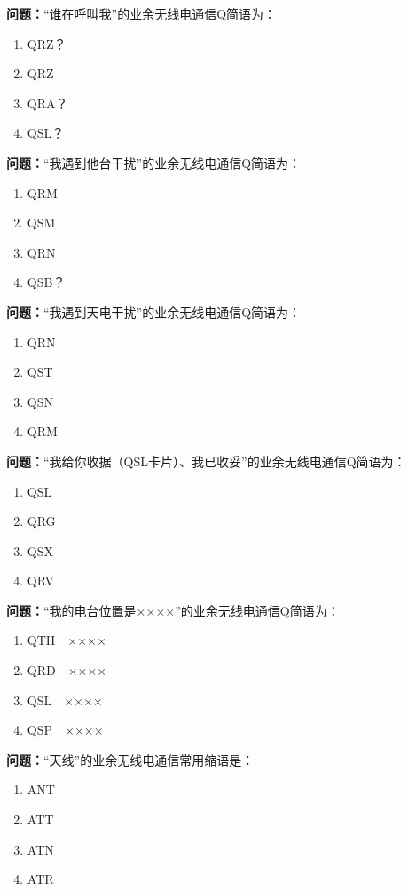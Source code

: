 \documentclass{ctexbook}%
\begin{document}
\textbf{问题：}“谁在呼叫我”的业余无线电通信Q简语为：
\begin{enumerate}[label=\Alph*), leftmargin=3em]
\item QRZ？
\item QRZ
\item QRA？
\item QSL？
\end{enumerate}

\textbf{问题：}“我遇到他台干扰”的业余无线电通信Q简语为：
\begin{enumerate}[label=\Alph*), leftmargin=3em]
\item QRM
\item QSM
\item QRN
\item QSB？
\end{enumerate}

\textbf{问题：}“我遇到天电干扰”的业余无线电通信Q简语为：
\begin{enumerate}[label=\Alph*), leftmargin=3em]
\item QRN
\item QST
\item QSN
\item QRM
\end{enumerate}

\textbf{问题：}“我给你收据（QSL卡片）、我已收妥”的业余无线电通信Q简语为：
\begin{enumerate}[label=\Alph*), leftmargin=3em]
\item QSL
\item QRG
\item QSX
\item QRV
\end{enumerate}

\textbf{问题：}“我的电台位置是××××”的业余无线电通信Q简语为：
\begin{enumerate}[label=\Alph*), leftmargin=3em]
\item QTH　××××
\item QRD　××××
\item QSL　××××
\item QSP　××××
\end{enumerate}

\textbf{问题：}“天线”的业余无线电通信常用缩语是：
\begin{enumerate}[label=\Alph*), leftmargin=3em]
\item ANT
\item ATT
\item ATN
\item ATR
\end{enumerate}
\end{document}
